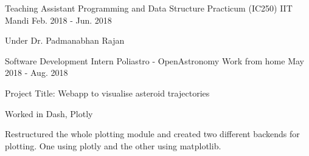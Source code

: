 


\begin{cventries}


\cventry
{Teaching Assistant} %
{Programming and Data Structure Practicum (IC250)} %
{IIT Mandi} %
{Feb. 2018 - Jun. 2018} %
{ %
\begin{cvitems}
\item {Under Dr. Padmanabhan Rajan}
\end{cvitems}
}


\cventry
{Software Development Intern} %
{Poliastro - OpenAstronomy} %
{Work from home} %
{May 2018 - Aug. 2018} %
{ %
\begin{cvitems}
\item {Project Title: Webapp to visualise asteroid trajectories}
\item {Worked in Dash, Plotly}
\item {Restructured the whole plotting module and created two different backends for plotting. One using plotly and the other using matplotlib.}
\end{cvitems}
}

\end{cventries}
